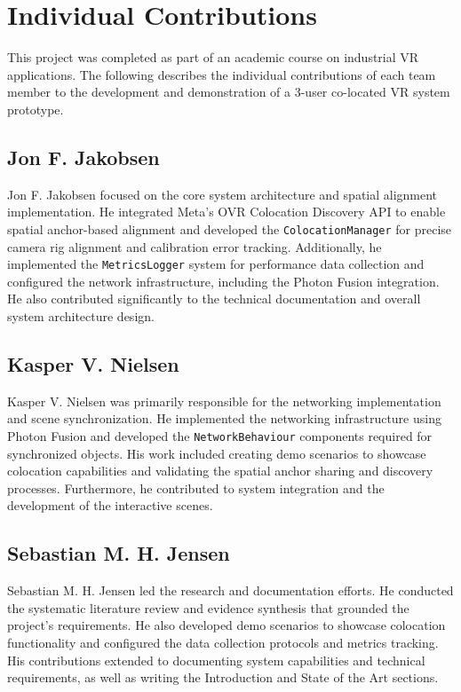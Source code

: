 \section*{Individual Contributions}

This project was completed as part of an academic course on industrial VR applications. The following describes the individual contributions of each team member to the development and demonstration of a 3-user co-located VR system prototype.

\subsection*{Jon F. Jakobsen}
Jon F. Jakobsen focused on the core system architecture and spatial alignment implementation. He integrated Meta's OVR Colocation Discovery API to enable spatial anchor-based alignment and developed the \texttt{ColocationManager} for precise camera rig alignment and calibration error tracking. Additionally, he implemented the \texttt{MetricsLogger} system for performance data collection and configured the network infrastructure, including the Photon Fusion integration. He also contributed significantly to the technical documentation and overall system architecture design.

\subsection*{Kasper V. Nielsen}
Kasper V. Nielsen was primarily responsible for the networking implementation and scene synchronization. He implemented the networking infrastructure using Photon Fusion and developed the \texttt{NetworkBehaviour} components required for synchronized objects. His work included creating demo scenarios to showcase colocation capabilities and validating the spatial anchor sharing and discovery processes. Furthermore, he contributed to system integration and the development of the interactive scenes.

\subsection*{Sebastian M. H. Jensen}
Sebastian M. H. Jensen led the research and documentation efforts. He conducted the systematic literature review and evidence synthesis that grounded the project's requirements. He also developed demo scenarios to showcase colocation functionality and configured the data collection protocols and metrics tracking. His contributions extended to documenting system capabilities and technical requirements, as well as writing the Introduction and State of the Art sections.


